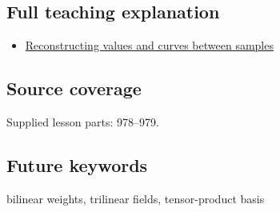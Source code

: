 \subsection{Full teaching explanation}\label{appendix-0a09b6dfdc86-full-teaching-explanation}

\begin{itemize}
\tightlist
\item
  \hyperref[02-foundations-ii-ch028-reconstructing-values-and-curves-between-samples]{Reconstructing values and curves between samples}
\end{itemize}

\subsection{Source coverage}\label{appendix-0a09b6dfdc86-source-coverage}

Supplied lesson parts: 978--979.

\subsection{Future keywords}\label{appendix-0a09b6dfdc86-future-keywords}

bilinear weights, trilinear fields, tensor-product basis
